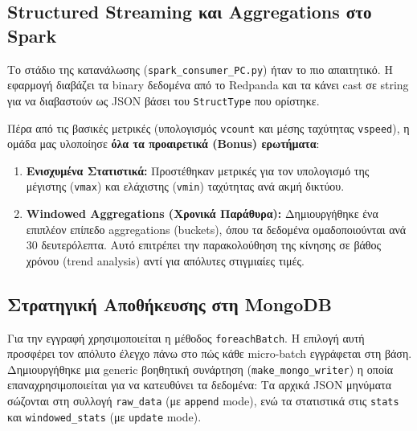\documentclass[11pt,a4paper]{article}
\begin{document}
\subsection{Structured Streaming και Aggregations στο Spark}
Το στάδιο της κατανάλωσης (\texttt{spark\_consumer\_PC.py}) ήταν το πιο απαιτητικό. Η εφαρμογή διαβάζει τα binary δεδομένα από το Redpanda και τα κάνει cast σε string για να διαβαστούν ως JSON βάσει του \texttt{StructType} που ορίστηκε. 

Πέρα από τις βασικές μετρικές (υπολογισμός \texttt{vcount} και μέσης ταχύτητας \texttt{vspeed}), η ομάδα μας υλοποίησε \textbf{όλα τα προαιρετικά (Bonus) ερωτήματα}:
\begin{enumerate}
    \item \textbf{Ενισχυμένα Στατιστικά:} Προστέθηκαν μετρικές για τον υπολογισμό της μέγιστης (\texttt{vmax}) και ελάχιστης (\texttt{vmin}) ταχύτητας ανά ακμή δικτύου.
    \item \textbf{Windowed Aggregations (Χρονικά Παράθυρα):} Δημιουργήθηκε ένα επιπλέον επίπεδο aggregations (buckets), όπου τα δεδομένα ομαδοποιούνται ανά 30 δευτερόλεπτα. Αυτό επιτρέπει την παρακολούθηση της κίνησης σε βάθος χρόνου (trend analysis) αντί για απόλυτες στιγμιαίες τιμές.
\end{enumerate}

\subsection{Στρατηγική Αποθήκευσης στη MongoDB}
Για την εγγραφή χρησιμοποιείται η μέθοδος \texttt{foreachBatch}. Η επιλογή αυτή προσφέρει τον απόλυτο έλεγχο πάνω στο πώς κάθε micro-batch εγγράφεται στη βάση. Δημιουργήθηκε μια generic βοηθητική συνάρτηση (\texttt{make\_mongo\_writer}) η οποία επαναχρησιμοποιείται για να κατευθύνει τα δεδομένα:
Τα αρχικά JSON μηνύματα σώζονται στη συλλογή \texttt{raw\_data} (με \texttt{append} mode), ενώ τα στατιστικά στις \texttt{stats} και \texttt{windowed\_stats} (με \texttt{update} mode).
\end{document}
